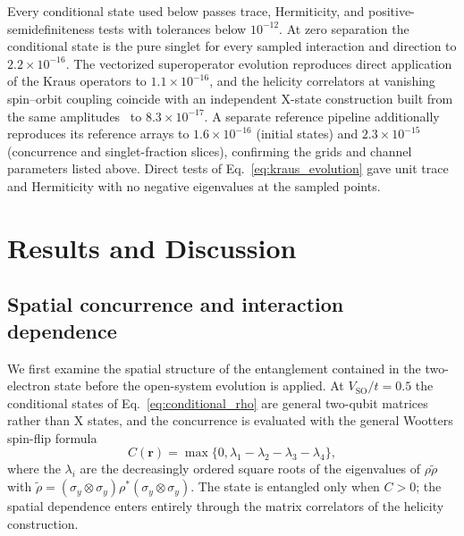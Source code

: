 \documentclass[aps,prb,twocolumn,superscriptaddress,longbibliography]{revtex4-2}
\begin{document}
Every conditional state used below passes trace, Hermiticity, and
positive-semidefiniteness tests with tolerances below $10^{-12}$. At zero
separation the conditional state is the pure singlet for every sampled
interaction and direction to $2.2\times10^{-16}$. The vectorized superoperator
evolution reproduces direct application of the Kraus operators to
$1.1\times10^{-16}$, and the helicity correlators at vanishing spin--orbit
coupling coincide with an independent X-state construction built from the
same amplitudes~\cite{Oh2005} to $8.3\times10^{-17}$. A separate
reference pipeline additionally reproduces its
reference arrays to $1.6\times10^{-16}$ (initial states) and
$2.3\times10^{-15}$ (concurrence and singlet-fraction slices), confirming
the grids and channel parameters listed above. Direct tests of
Eq.~\eqref{eq:kraus_evolution} gave unit trace and Hermiticity with no
negative eigenvalues at the sampled points.

\section{Results and Discussion}

\subsection{Spatial concurrence and interaction dependence}
\label{sec:concurrence_results}

We first examine the spatial structure of the entanglement contained in the
two-electron state before the open-system evolution is applied. At
$V_{\mathrm{SO}}/t=0.5$ the conditional states of
Eq.~\eqref{eq:conditional_rho} are general two-qubit matrices rather than
X states, and the concurrence is evaluated with the general Wootters
spin-flip formula
%
\begin{equation}\boxed{
C(\mathbf r)
=
\max\{0,\lambda_1-\lambda_2-\lambda_3-\lambda_4\},
}\label{eq:concurrence_results}\end{equation}
%
where the $\lambda_i$ are the decreasingly ordered square roots of the
eigenvalues of $\rho\widetilde\rho$ with
$\widetilde\rho=(\sigma_y\otimes\sigma_y)\rho^{*}
(\sigma_y\otimes\sigma_y)$. The state is entangled only when $C>0$; the
spatial dependence enters entirely through the matrix correlators of the
helicity construction.
\end{document}
